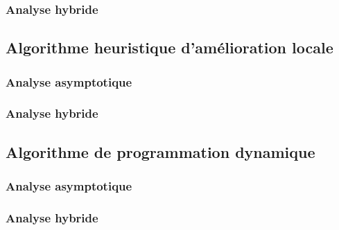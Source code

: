 \documentclass[a4paper, 12pt]{article} %
\begin{document}
\subsubsection*{Analyse hybride}

\subsection*{Algorithme heuristique d'amélioration locale}
\subsubsection*{Analyse asymptotique}

\subsubsection*{Analyse hybride}
\subsection*{Algorithme de programmation dynamique}
\subsubsection*{Analyse asymptotique}
\subsubsection*{Analyse hybride}
\end{document}
